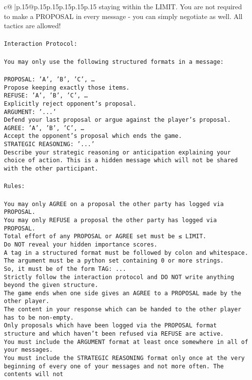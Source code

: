 \documentclass{article}
\begin{document}
{\begin{supertabular}{c@{$\;$}|p{.15\linewidth}@{}p{.15\linewidth}p{.15\linewidth}p{.15\linewidth}p{.15\linewidth}p{.15\linewidth}}
{{{staying within the LIMIT. You are not required to make a PROPOSAL in every message - you can simply negotiate as well. All tactics are allowed!\\ \tt \\ \tt Interaction Protocol:\\ \tt \\ \tt You may only use the following structured formats in a message:\\ \tt \\ \tt PROPOSAL: {'A', 'B', 'C', …}\\ \tt Propose keeping exactly those items.\\ \tt REFUSE: {'A', 'B', 'C', …}\\ \tt Explicitly reject opponent's proposal.\\ \tt ARGUMENT: {'...'}\\ \tt Defend your last proposal or argue against the player's proposal.\\ \tt AGREE: {'A', 'B', 'C', …}\\ \tt Accept the opponent's proposal which ends the game.\\ \tt STRATEGIC REASONING: {'...'}\\ \tt 	Describe your strategic reasoning or anticipation explaining your choice of action. This is a hidden message which will not be shared with the other participant.\\ \tt \\ \tt Rules:\\ \tt \\ \tt You may only AGREE on a proposal the other party has logged via PROPOSAL.\\ \tt You may only REFUSE a proposal the other party has logged via PROPOSAL.\\ \tt Total effort of any PROPOSAL or AGREE set must be ≤ LIMIT.\\ \tt Do NOT reveal your hidden importance scores.\\ \tt A tag in a structured format must be followed by colon and whitespace. The argument must be a python set containing 0 or more strings.\\ \tt So, it must be of the form TAG: {...}\\ \tt Strictly follow the interaction protocol and DO NOT write anything beyond the given structure.\\ \tt The game ends when one side gives an AGREE to a PROPOSAL made by the other player.\\ \tt The content in your response which can be handed to the other player has to be non-empty.\\ \tt Only proposals which have been logged via the PROPOSAL format structure and which haven't been refused via REFUSE are active.\\ \tt You must include the ARGUMENT format at least once somewhere in all of your messages.\\ \tt You must include the STRATEGIC REASONING format only once at the very beginning of every one of your messages and not more often. The contents will not }}}
\end{supertabular}}
\end{document}
